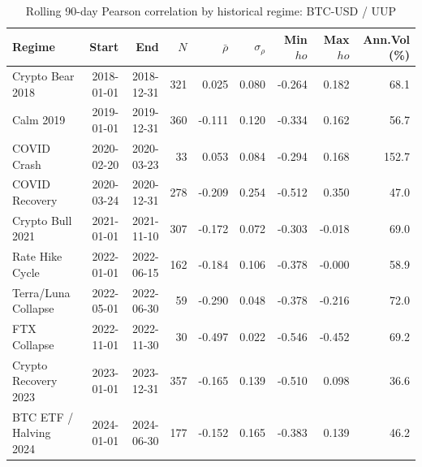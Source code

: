 \begin{table}[H]
\centering
\small
\caption{Rolling 90-day Pearson correlation by historical regime: BTC-USD / UUP}
\label{tab:regime_corr_BTCUSDUUP}
\begin{tabular}{lrrrrrrrr}
\toprule
Regime & Start & End & $N$ & $\bar{\rho}$ & $\sigma_\rho$ & Min $
ho$ & Max $
ho$ & Ann.Vol (\%) \\
\midrule
Crypto Bear 2018 & 2018-01-01 & 2018-12-31 & 321 & 0.025 & 0.080 & -0.264 & 0.182 & 68.1 \\
Calm 2019 & 2019-01-01 & 2019-12-31 & 360 & -0.111 & 0.120 & -0.334 & 0.162 & 56.7 \\
COVID Crash & 2020-02-20 & 2020-03-23 & 33 & 0.053 & 0.084 & -0.294 & 0.168 & 152.7 \\
COVID Recovery & 2020-03-24 & 2020-12-31 & 278 & -0.209 & 0.254 & -0.512 & 0.350 & 47.0 \\
Crypto Bull 2021 & 2021-01-01 & 2021-11-10 & 307 & -0.172 & 0.072 & -0.303 & -0.018 & 69.0 \\
Rate Hike Cycle & 2022-01-01 & 2022-06-15 & 162 & -0.184 & 0.106 & -0.378 & -0.000 & 58.9 \\
Terra/Luna Collapse & 2022-05-01 & 2022-06-30 & 59 & -0.290 & 0.048 & -0.378 & -0.216 & 72.0 \\
FTX Collapse & 2022-11-01 & 2022-11-30 & 30 & -0.497 & 0.022 & -0.546 & -0.452 & 69.2 \\
Crypto Recovery 2023 & 2023-01-01 & 2023-12-31 & 357 & -0.165 & 0.139 & -0.510 & 0.098 & 36.6 \\
BTC ETF / Halving 2024 & 2024-01-01 & 2024-06-30 & 177 & -0.152 & 0.165 & -0.383 & 0.139 & 46.2 \\
\bottomrule
\end{tabular}
\end{table}